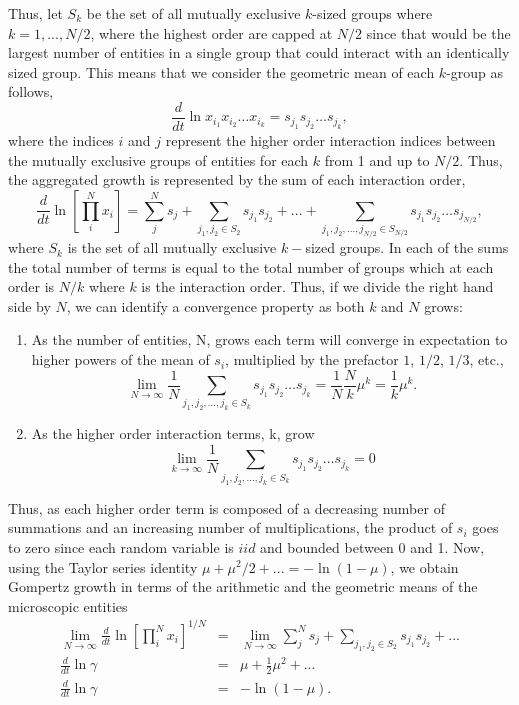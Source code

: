 \documentclass{article}
\begin{document}
Thus, let $S_k$ be the set of all mutually exclusive $k$-sized groups where $k=1,..., N/2$, where the highest order are capped at $N/2$ since that would be the largest number of entities in a single group that could interact with an identically sized group. This means that we consider the geometric mean of each $k$-group as follows,
\begin{equation}
\label{eq:modSIR4}
\frac{d}{dt} \ln x_{i_1} x_{i_2} \dots x_{i_k} = s_{j_1}s_{j_2}\dots s_{j_k}, 
\end{equation}
where the indices $i$ and $j$ represent the higher order interaction indices between the mutually exclusive groups of entities for each $k$ from 1 and up to $N/2$. Thus, the aggregated growth is represented by the sum of each interaction order,
\begin{equation}
\label{eq:MicroGomp0}
\frac{d}{dt} \ln \left[ \prod_i^N x_i \right ] = \sum_j^N s_{j} + \sum_{j_1, j_2 \in S_2} s_{j_1}s_{j_2} + ... + \sum_{j_1, j_2, ..., j_{N/2} \in S_{N/2}} s_{j_1}s_{j_2}\dots s_{j_{N/2}},
\end{equation}
where $S_k$ is the set of all mutually exclusive $k-$sized groups. In each of the sums the total number of terms is equal to the total number of groups which at each order is $N/k$ where $k$ is the interaction order. Thus, if we divide the right hand side by $N$, we can identify a convergence property as both $k$ and $N$ grows:
\begin{enumerate}
\item As the number of entities, N, grows each term will converge in expectation to higher powers of the mean of $s_i$, multiplied by the prefactor $1$, $1/2$, $1/3$, etc., 
\begin{equation}
\label{eq:MicroGomp11}
\lim_{N\rightarrow \infty} \frac{1}{N}\sum_{j_1, j_2, ..., j_k \in S_k} s_{j_1}s_{j_2}\dots s_{j_k} = \frac{1}{N}\frac{N}{k} \mu^{k} = \frac{1}{k} \mu^{k}.
\end{equation}
\item As the higher order interaction terms, k, grow
\begin{equation}
\label{eq:MicroGomp12}
\lim_{k\rightarrow \infty} \frac{1}{N}\sum_{j_1, j_2, ..., j_k \in S_k} s_{j_1}s_{j_2}\dots s_{j_k} = 0
\end{equation}
\end{enumerate}
Thus, as each higher order term is composed of a decreasing number of summations and an increasing number of multiplications, the product of $s_i$ goes to zero since each random variable is $iid$ and bounded between 0 and 1. 
Now, using the Taylor series identity $\mu+\mu^2/2+... = -\ln(1-\mu)$, we obtain Gompertz growth in terms of the arithmetic and the geometric means of the microscopic entities
\begin{eqnarray*}
\label{eq:MicroGomp13}
\lim_{N\rightarrow \infty}\frac{d}{dt} \ln \left[ \prod_i^N x_i \right ]^{1/N} &=&  \lim_{N\rightarrow \infty}\sum_j^N s_{j} + \sum_{j_1, j_2 \in S_2} s_{j_1}s_{j_2} + ...\\
\frac{d}{dt} \ln \gamma &=&  \mu + \frac{1}{2} \mu^2 + ...\\
\frac{d}{dt} \ln \gamma &=& - \ln (1-\mu).
\end{eqnarray*}
\end{document}
